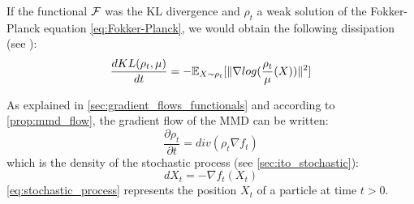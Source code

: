 \begin{remark}
	If the functional ${{\mathcal F}}$ was the KL divergence and $\rho_t$ a weak solution of the Fokker-Planck equation \eqref{eq:Fokker-Planck}, we would obtain the following dissipation (see \cite{wibisono2018sampling}):
	\begin{equation}
	\frac{d KL(\rho_t, \mu)}{dt}=-{{\mathbb E}}_{X \sim \rho_t}[\|\nabla log(\frac{\rho_t}{\mu}(X))\|^2]
	\end{equation}
\end{remark}


As explained in \cref{sec:gradient_flows_functionals} and according to \cref{prop:mmd_flow}, the gradient flow of the MMD can be written:
\begin{equation*}
\frac{\partial \rho_t}{\partial t}= div(\rho_t  \nabla f_t)
\end{equation*}
which is the density of the stochastic process (see \cref{sec:ito_stochastic}):
\begin{equation}\label{eq:stochastic_process}
dX_t=-\nabla f_t(X_t) 
\end{equation}
\eqref{eq:stochastic_process} represents the position $X_t$ of a particle at time $t > 0$.




